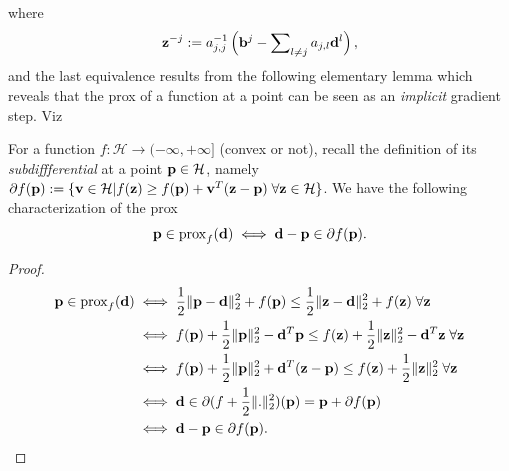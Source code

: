 where
\[
  \mathbf{z}^{-j} := a_{j,j}^{-1}\left(\mathbf{b}^j-\sum\nolimits_{l \ne j}a_{j,l}\mathbf{d}^l\right),
\]
and the last equivalence results from the following elementary lemma which reveals that the prox of a function at a point can be seen as an \textit{implicit} gradient step. Viz
\begin{lemma}
  For a function $f: \mathcal H \rightarrow (-\infty,+\infty]$ (convex or not), recall the definition of its \textit{subdiffferential} at a point $\mathbf{p} \in \mathcal H$, namely  $\partial f(\mathbf{p}) := \{\mathbf{v} \in \mathcal H | f(\mathbf{z}) \ge f(\mathbf{p}) + \mathbf{v}^T(\mathbf{z} - \mathbf{p})\; \forall \mathbf{z} \in \mathcal H\}$. We have the following characterization of the prox
  \begin{equation}
    \mathbf{p} \in \operatorname{prox}_{f}(\mathbf{d}) \iff \mathbf{d}-\mathbf{p} \in \partial f(\mathbf{p}).
\end{equation}

  \label{thm:implicit_grad}
\end{lemma}
\begin{proof}
  \[
    \begin{split}
      \mathbf{p} \in \operatorname{prox}_{f}(\mathbf{d}) &\iff \frac{1}{2}\|\mathbf{p}-\mathbf{d}\|_2^2 + f(\mathbf{p}) \le \frac{1}{2}\|\mathbf{z}-\mathbf{d}\|_2^2 + f(\mathbf{z})\; \forall \mathbf{z}\\
      &\iff f(\mathbf{p}) + \frac{1}{2}\|\mathbf{p}\|_2^2 -\mathbf{d}^T\mathbf{p} \le f(\mathbf{z}) + \frac{1}{2}\|\mathbf{z}\|_2^2 -\mathbf{d}^T\mathbf{z}\; \forall \mathbf{z}\\
      &\iff f(\mathbf{p}) + \frac{1}{2}\|\mathbf{p}\|_2^2 + \mathbf{d}^T(\mathbf{z}-\mathbf{p}) \le f(\mathbf{z}) + \frac{1}{2}\|\mathbf{z}\|_2^2\;\forall \mathbf{z}\\
      &\iff \mathbf{d} \in \partial (f + \frac{1}{2}\|.\|_2^2)(\mathbf{p}) = \mathbf{p} + \partial f(\mathbf{p})\\
      &\iff \mathbf{d} - \mathbf{p} \in \partial f(\mathbf{p}).
    \end{split}
  \]
\end{proof}

